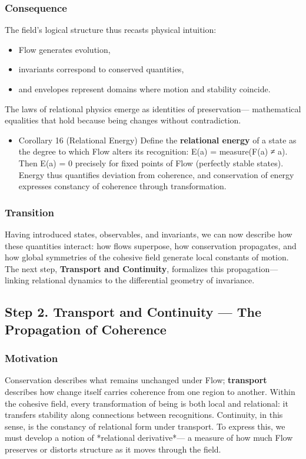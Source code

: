 \documentclass[11pt]{article}
\begin{document}
\subsubsection*{Consequence}
\label{sec:orgebd55f2}
The field’s logical structure thus recasts physical intuition:  
\begin{itemize}
\item Flow generates evolution,
\item invariants correspond to conserved quantities,
\item and envelopes represent domains where motion and stability coincide.
\end{itemize}
The laws of relational physics emerge as identities of preservation—  
mathematical equalities that hold because being changes without contradiction.
\begin{itemize}
\item Corollary 16 (Relational Energy)
\label{sec:org84e897b}
Define the \textbf{relational energy} of a state as the degree to which Flow alters its recognition:  
E(a) = measure(F(a) ≠ a).  
Then E(a) = 0  precisely for fixed points of Flow (perfectly stable states).  
Energy thus quantifies deviation from coherence,  
and conservation of energy expresses constancy of coherence through transformation.
\end{itemize}
\subsubsection*{Transition}
\label{sec:org21b7c72}
Having introduced states, observables, and invariants,  
we can now describe how these quantities interact:  
how flows superpose, how conservation propagates,  
and how global symmetries of the cohesive field generate local constants of motion.  
The next step, \textbf{Transport and Continuity}, formalizes this propagation—  
linking relational dynamics to the differential geometry of invariance.
\subsection*{Step 2. Transport and Continuity — The Propagation of Coherence}
\label{sec:orga956e2f}

\subsubsection*{Motivation}
\label{sec:org99676ea}
Conservation describes what remains unchanged under Flow;  
\textbf{transport} describes how change itself carries coherence from one region to another.  
Within the cohesive field, every transformation of being is both local and relational:  
it transfers stability along connections between recognitions.  
Continuity, in this sense, is the constancy of relational form under transport.  
To express this, we must develop a notion of *relational derivative*—  
a measure of how much Flow preserves or distorts structure as it moves through the field.
\end{document}
